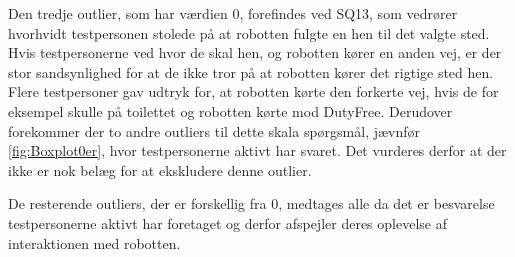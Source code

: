 Den tredje outlier, som har værdien 0, forefindes ved SQ13, som vedrører hvorhvidt testpersonen stolede på at robotten fulgte en hen til det valgte sted. Hvis testpersonerne ved hvor de skal hen, og robotten kører en anden vej, er der stor sandsynlighed for at de ikke tror på at robotten kører det rigtige sted hen. Flere testpersoner gav udtryk for, at robotten kørte den forkerte vej, hvis de for eksempel skulle på toilettet og robotten kørte mod DutyFree. Derudover forekommer der to andre outliers til dette skala spørgsmål, jævnfør \autoref{fig:Boxplot0er}, hvor testpersonerne aktivt har svaret. Det vurderes derfor at der ikke er nok belæg for at ekskludere denne outlier. 

De resterende outliers, der er forskellig fra 0, medtages alle da det er besvarelse testpersonerne aktivt har foretaget og derfor afspejler deres oplevelse af interaktionen med robotten.  
